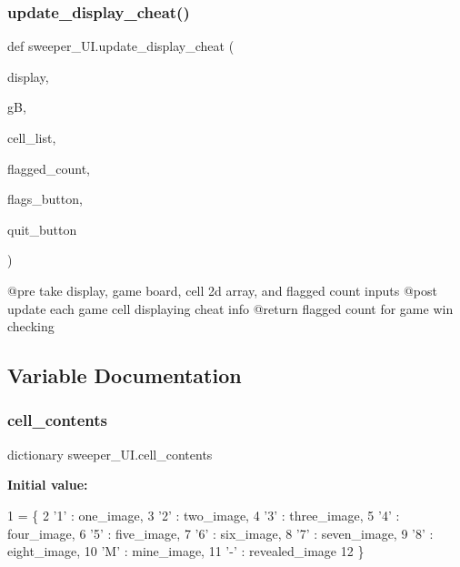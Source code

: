 \subsubsection{\texorpdfstring{update\+\_\+display\+\_\+cheat()}{update\_display\_cheat()}}
{\footnotesize\ttfamily def sweeper\+\_\+\+U\+I.\+update\+\_\+display\+\_\+cheat (\begin{DoxyParamCaption}\item[{}]{display,  }\item[{}]{gB,  }\item[{}]{cell\+\_\+list,  }\item[{}]{flagged\+\_\+count,  }\item[{}]{flags\+\_\+button,  }\item[{}]{quit\+\_\+button }\end{DoxyParamCaption})}

\begin{DoxyVerb}@pre take display, game board, cell 2d array, and flagged count inputs
@post update each game cell displaying cheat info
@return flagged count for game win checking
\end{DoxyVerb}
 

\subsection{Variable Documentation}
\mbox{\label{namespacesweeper___u_i_a7d0e80394d61cdf349f0f82925f988a1}} 
\subsubsection{\texorpdfstring{cell\+\_\+contents}{cell\_contents}}
{\footnotesize\ttfamily dictionary sweeper\+\_\+\+U\+I.\+cell\+\_\+contents}

{\bfseries Initial value\+:}
\begin{DoxyCode}
1 =  \{
2     \textcolor{stringliteral}{'1'} : one\_image,
3     \textcolor{stringliteral}{'2'} : two\_image,
4     \textcolor{stringliteral}{'3'} : three\_image,
5     \textcolor{stringliteral}{'4'} : four\_image,
6     \textcolor{stringliteral}{'5'} : five\_image,
7     \textcolor{stringliteral}{'6'} : six\_image,
8     \textcolor{stringliteral}{'7'} : seven\_image,
9     \textcolor{stringliteral}{'8'} : eight\_image,
10     \textcolor{stringliteral}{'M'} : mine\_image,
11     \textcolor{stringliteral}{'-'} : revealed\_image
12 \}
\end{DoxyCode}
